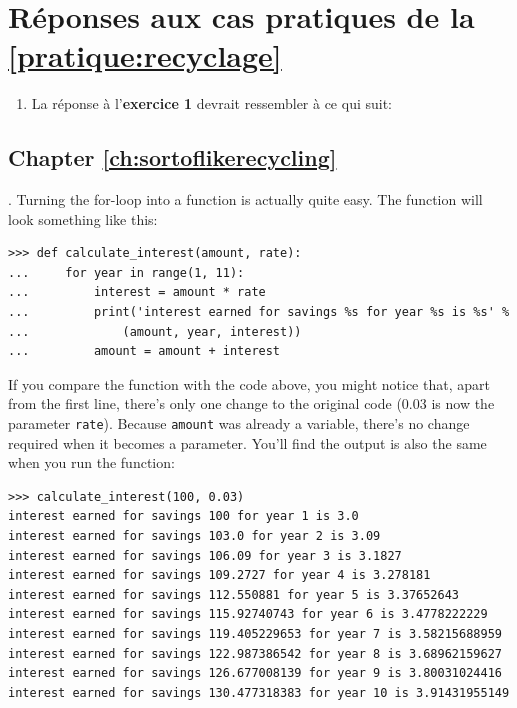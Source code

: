 \section{Réponses aux cas pratiques de la \autoref{pratique:recyclage}\label{reponses:recyclage}}
\begin{enumerate}
\item La réponse à l'\textbf{exercice 1} devrait ressembler à ce qui suit: 

\end{enumerate}

\subsection*{Chapter \ref{ch:sortoflikerecycling}}

. Turning the for-loop into a function is actually quite easy.  The function will look something like this:

\begin{listing}
\begin{verbatim}
>>> def calculate_interest(amount, rate):
...     for year in range(1, 11):
...         interest = amount * rate
...         print('interest earned for savings %s for year %s is %s' % 
...             (amount, year, interest))
...         amount = amount + interest
\end{verbatim}
\end{listing}

If you compare the function with the code above, you might notice that, apart from the first line, there's only one change to the original code (0.03 is now the parameter \texttt{rate}). Because \texttt{amount} was already a variable, there's no change required when it becomes a parameter. You'll find the output is also the same when you run the function:

\begin{listing}
\begin{verbatim}
>>> calculate_interest(100, 0.03)
interest earned for savings 100 for year 1 is 3.0
interest earned for savings 103.0 for year 2 is 3.09
interest earned for savings 106.09 for year 3 is 3.1827
interest earned for savings 109.2727 for year 4 is 3.278181
interest earned for savings 112.550881 for year 5 is 3.37652643
interest earned for savings 115.92740743 for year 6 is 3.4778222229
interest earned for savings 119.405229653 for year 7 is 3.58215688959
interest earned for savings 122.987386542 for year 8 is 3.68962159627
interest earned for savings 126.677008139 for year 9 is 3.80031024416
interest earned for savings 130.477318383 for year 10 is 3.91431955149
\end{verbatim}
\end{listing}

